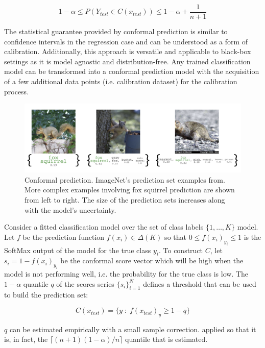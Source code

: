 $$
1 - \alpha \leq P(Y_{test} \in C(x_{test})) \leq 1 - \alpha + \frac{1}{n+1}
$$

The statistical guarantee provided by conformal prediction is similar to confidence intervals in the regression case and can be understood as a form of calibration. Additionally, this approach is versatile and applicable to black-box settings as it is model agnostic and distribution-free. Any trained classification model can be transformed into a conformal prediction model with the acquisition of a few additional data points (i.e. calibration dataset) for the calibration process.

\begin{figure}
    \centering
    \includegraphics[scale=0.55]{figures/related_work/conformal_predictions.png}
    \caption{Conformal prediction. ImageNet's prediction set examples from\cite{conformalPredictions2021}. More complex examples involving fox squirrel prediction are shown from left to right. The size of the prediction sets increases along with the model's uncertainty.}
    \label{fig:conformal-prediction-example}
\end{figure}


  Consider a fitted classification model over the set of class labels $\{1,\ldots, K\}$ model. Let $f$ be the prediction function $f(x_i) \in \Delta(K)$ so that $0 \leq f(x_i)_{y_i} \leq 1$ is the SoftMax output of the model for the true class $y_i$. To construct $C$, let $s_i = 1 - f(x_i)_{y_i}$ be the conformal score vector which will be high when the model is not performing well, i.e. the probability for the true class is low. The $1-\alpha$ quantile $q$ of the scores series $\{s_i\}_{i=1}^N$ defines a threshold that can be used to build the prediction set:

  $$    
    C(x_{test}) = \{y \;:\; f(x_{test})_{y} \geq 1-q \}
  $$

  $q$ can be estimated empirically with a small sample correction.  applied so that it is, in fact, the $\lceil (n+1)(1-\alpha)/n \rceil$ quantile that is estimated.

